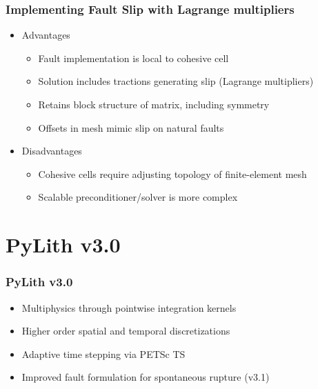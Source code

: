 \documentclass[aspectratio=169,hyperref=colorlinks]{beamer}
\begin{document}
\begin{frame}
  \frametitle{Implementing Fault Slip with Lagrange multipliers}
 
 \begin{itemize}
 \item Advantages
   \begin{itemize}
   \item Fault implementation is local to cohesive cell
   \item Solution includes tractions generating slip (Lagrange multipliers)
   \item Retains block structure of matrix, including symmetry
   \item Offsets in mesh mimic slip on natural faults
   \end{itemize}
 \item Disadvantages 
   \begin{itemize}
   \item Cohesive cells require adjusting topology of finite-element
     mesh
   \item Scalable preconditioner/solver is more complex
  \end{itemize}
 \end{itemize}
  
\end{frame}


\section{PyLith v3.0}

\begin{frame}
  \frametitle{PyLith v3.0}
  \summary{}

  \begin{itemize}
  \item Multiphysics through pointwise integration kernels
  \item Higher order spatial and temporal discretizations
  \item Adaptive time stepping via PETSc TS
  \item Improved fault formulation for spontaneous rupture (v3.1)
  \end{itemize}

\end{frame}

\abovedisplayskip=2pt
\abovedisplayshortskip=2pt
\belowdisplayskip=2pt
\belowdisplayshortskip=2pt
\end{document}
